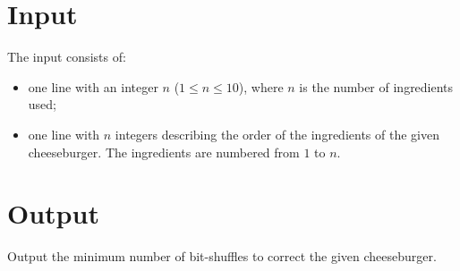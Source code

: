 \section*{Input}

The input consists of:
\begin{itemize}
\item one line with an integer $n$ ($1 \leq n \leq 10$), where $n$ is the number of ingredients used;
\item one line with $n$ integers describing the order of the ingredients of the given cheeseburger. The ingredients are numbered from $1$ to $n$.
\end{itemize}

\section*{Output}

Output the minimum number of bit-shuffles to correct the given cheeseburger. 
